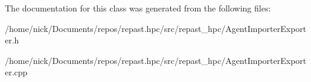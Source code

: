 The documentation for this class was generated from the following files\-:\begin{DoxyCompactItemize}
\item 
/home/nick/\-Documents/repos/repast.\-hpc/src/repast\-\_\-hpc/Agent\-Importer\-Exporter.\-h\item 
/home/nick/\-Documents/repos/repast.\-hpc/src/repast\-\_\-hpc/Agent\-Importer\-Exporter.\-cpp\end{DoxyCompactItemize}
